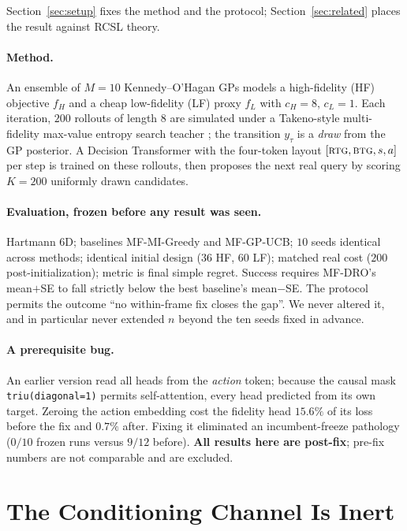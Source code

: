 \documentclass[11pt]{article}
\begin{document}
Section~\ref{sec:setup} fixes the method and the protocol;
Section~\ref{sec:related} places the result against RCSL theory.

\paragraph{Method.} An ensemble of $M{=}10$ Kennedy--O'Hagan GPs models a
high-fidelity (HF) objective $f_H$ and a cheap low-fidelity (LF) proxy $f_L$
with $c_H{=}8$, $c_L{=}1$. Each iteration, $200$ rollouts of length $8$ are
simulated under a Takeno-style multi-fidelity max-value entropy search teacher
\citep{takeno2020mfmes}; the transition $y_\tau$ is a \emph{draw} from the GP
posterior. A Decision Transformer with the four-token layout
$[\textsc{rtg}, \textsc{btg}, s, a]$ per step is trained on these rollouts, then
proposes the next real query by scoring $K{=}200$ uniformly drawn candidates.

\paragraph{Evaluation, frozen before any result was seen.} Hartmann 6D;
baselines MF-MI-Greedy and MF-GP-UCB; $10$ seeds identical across methods;
identical initial design ($36$ HF, $60$ LF); matched real cost ($200$
post-initialization); metric is final simple regret. Success requires
MF-DRO's mean${+}$SE to fall strictly below the best baseline's mean${-}$SE.
The protocol permits the outcome ``no within-frame fix closes the gap''. We
never altered it, and in particular never extended $n$ beyond the ten seeds
fixed in advance.

\paragraph{A prerequisite bug.} An earlier version read all heads from the
\emph{action} token; because the causal mask \texttt{triu(diagonal=1)} permits
self-attention, every head predicted from its own target. Zeroing the action
embedding cost the fidelity head $15.6\%$ of its loss before the fix and $0.7\%$
after. Fixing it eliminated an incumbent-freeze pathology ($0/10$ frozen runs
versus $9/12$ before). \textbf{All results here are post-fix}; pre-fix numbers
are not comparable and are excluded.

\section{The Conditioning Channel Is Inert}
\label{sec:mechanism}
\end{document}
